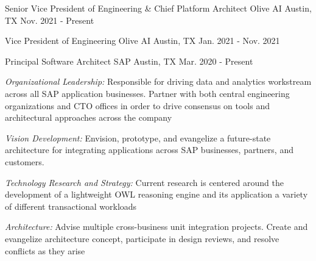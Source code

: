 \begin{cventries}


\cventry
{Senior Vice President of Engineering \& Chief Platform Architect}
{Olive AI}
{Austin, TX}
{Nov. 2021 - Present}
{
  \begin{cvitems}
  \end{cvitems}
}


\cventry
{Vice President of Engineering}
{Olive AI}
{Austin, TX}
{Jan. 2021 - Nov. 2021}
{
  \begin{cvitems}
  \end{cvitems}
}


\cventry
{Principal Software Architect}
{SAP}
{Austin, TX}
{Mar. 2020 - Present}
{
  \begin{cvitems}
  \item {\emph{Organizational Leadership:} Responsible for driving data and analytics workstream across all SAP application businesses. Partner with both central engineering organizations and CTO offices in order to drive consensus on tools and architectural approaches across the company }
  \item {\emph{Vision Development:} Envision, prototype, and evangelize a future-state architecture for integrating applications across SAP businesses, partners, and customers.}
  \item {\emph{Technology Research and Strategy:} Current research is centered around the development of a lightweight OWL reasoning engine and its application a variety of different transactional workloads }
  \item {\emph{Architecture:} Advise multiple cross-business unit integration projects. Create and evangelize architecture concept, participate in design reviews, and resolve conflicts as they arise }
  \end{cvitems}
}



\end{cventries}

